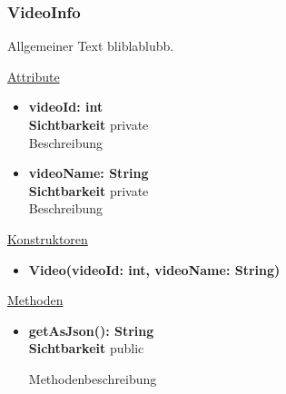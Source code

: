 \subsubsection{VideoInfo}
Allgemeiner Text bliblablubb. \newline

\underline{Attribute}
\begin{itemize}
\itemsep0pt
\item \textbf{videoId: int} \hfill\\ 
\textbf{Sichtbarkeit} private \hfill\\ 
Beschreibung 

\item \textbf{videoName: String} \hfill\\ 
\textbf{Sichtbarkeit} private \hfill\\ 
Beschreibung
\end{itemize}

\underline{Konstruktoren}
\begin{itemize}
\itemsep0pt
\item \textbf{Video(videoId: int, videoName: String)} \hfill\\
\end{itemize}

\underline{Methoden}
\begin{itemize}
\itemsep0pt
\item \textbf{getAsJson(): String}\hfill\\
\textbf{Sichtbarkeit} public

Methodenbeschreibung

\end{itemize}